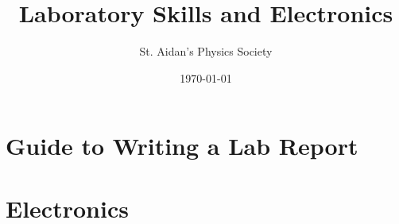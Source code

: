 \documentclass[12pt,%
               a4paper]{physics_notes}
\begin{document}
\title{Laboratory Skills and Electronics}
\author{St. Aidan's Physics Society}
\date{\today}
\maketitle

\tableofcontents
\newpage

\section{Guide to Writing a Lab Report}

\section{Electronics}

\end{document}
